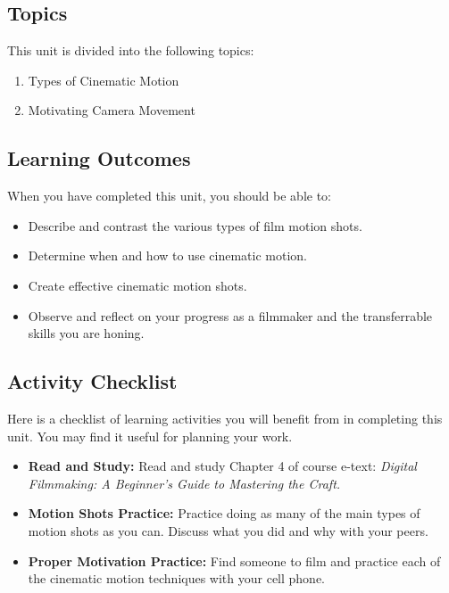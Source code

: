 \documentclass[
]{book}
\providecommand{\tightlist}{%
  \setlength{\itemsep}{0pt}\setlength{\parskip}{0pt}}
\begin{document}
\hypertarget{topics-3}{%
\subsection*{Topics}\label{topics-3}}

This unit is divided into the following topics:

\begin{enumerate}
\def\labelenumi{\arabic{enumi}.}
\tightlist
\item
  Types of Cinematic Motion\\
\item
  Motivating Camera Movement
\end{enumerate}

\hypertarget{learning-outcomes-3}{%
\subsection*{Learning Outcomes}\label{learning-outcomes-3}}

When you have completed this unit, you should be able to:

\begin{itemize}
\tightlist
\item
  Describe and contrast the various types of film motion shots.\\
\item
  Determine when and how to use cinematic motion.\\
\item
  Create effective cinematic motion shots.\\
\item
  Observe and reflect on your progress as a filmmaker and the transferrable skills you are honing.
\end{itemize}

\hypertarget{activity-checklist-3}{%
\subsection*{Activity Checklist}\label{activity-checklist-3}}

\begin{reflect}
Here is a checklist of learning activities you will benefit from in completing this unit. You may find it useful for planning your work.

\begin{itemize}
\tightlist
\item
  \textbf{Read and Study:} Read and study Chapter 4 of course e-text: \emph{Digital Filmmaking: A Beginner's Guide to Mastering the Craft.}
\item
  \textbf{Motion Shots Practice:} Practice doing as many of the main types of motion shots as you can. Discuss what you did and why with your peers.
\item
  \textbf{Proper Motivation Practice:} Find someone to film and practice each of the cinematic motion techniques with your cell phone.
\end{itemize}
\end{reflect}
\end{document}
